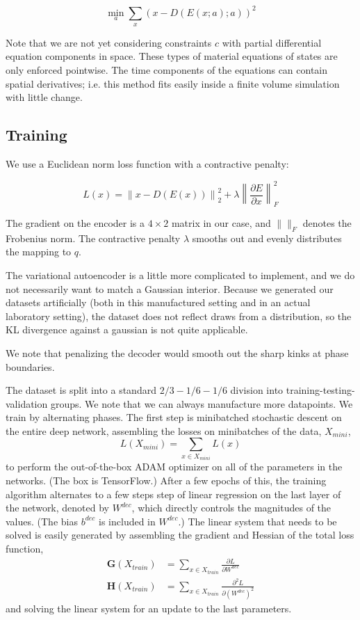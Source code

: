 \documentclass[]{article}
\begin{document}
\begin{equation}
\min_a \sum_x \left( x - D(E(x;a);a) \right)^2
\end{equation}

Note that we are not yet considering constraints \(c\) with partial
differential equation components in space. These types of material
equations of states are only enforced pointwise. The time components of
the equations can contain spatial derivatives; i.e. this method fits
easily inside a finite volume simulation with little change.

\hypertarget{header-n3305}{%
\subsection{Training}\label{header-n3305}}

We use a Euclidean norm loss function with a contractive penalty:

\[L(x)=\left\|x-D(E(x))\right\|^2_2+\lambda\left\|\frac{\partial E}{\partial x}\right\|_F^2\]

The gradient on the encoder is a \(4\times2\) matrix in our case, and
\(\|\|_F\) denotes the Frobenius norm. The contractive penalty
\(\lambda\) smooths out and evenly distributes the mapping to \(q\).

The variational autoencoder is a little more complicated to implement,
and we do not necessarily want to match a Gaussian interior. Because we
generated our datasets artificially (both in this manufactured setting
and in an actual laboratory setting), the dataset does not reflect draws
from a distribution, so the KL divergence against a gaussian is not
quite applicable.

We note that penalizing the decoder would smooth out the sharp kinks at
phase boundaries.

The dataset is split into a standard $2/3-1/6-1/6$ division into
training-testing-validation groups. We note that we can always
manufacture more datapoints. We train by alternating phases. The first
step is minibatched stochastic descent on the entire deep network, assembling the losses on minibatches of the data, $X_{mini}$,
\begin{equation}
  L(X_{mini}) = \sum_{x\in X_{mini}} L(x)
  \end{equation}
to perform the out-of-the-box ADAM optimizer on all of the
parameters in the networks. (The box is
TensorFlow.) After a few epochs of this,
the training algorithm alternates to a few steps step of linear regression on the last layer of the network,
denoted by \(W^{dec}\), which directly controls the magnitudes of the values.
(The bias $b^{dec}$ is included in $W^{dec}$.) The linear
system that needs to be solved is easily generated by assembling the
gradient and Hessian of the total loss function,
\begin{align}
 \mathbf{G}\left(X_{train}\right) &= \sum_{x\in X_{train}}\frac{\partial L}{\partial W^{dec}} \\
\mathbf{H}\left(X_{train}\right) &= \sum_{x\in X_{train}}\frac{\partial^2 L}{\partial (W^{dec})^2}
\end{align}
and solving the linear system for an update to the last parameters.
\end{document}
